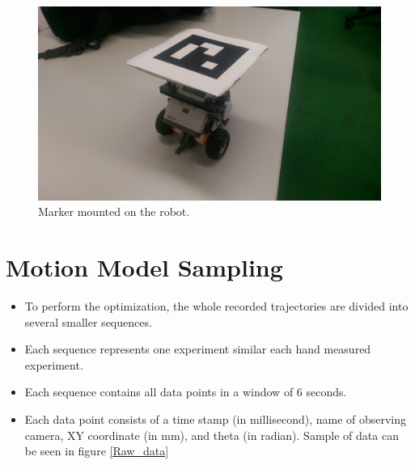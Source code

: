 \documentclass[paper=a4, fontsize=11pt]{scrartcl} %
\begin{document}
	\begin{figure}[h!]
        \begin{center}
            \setlength{\fboxsep}{0.5pt} %
            \setlength{\fboxrule}{0.5pt}
            \includegraphics[width=12cm,fbox]{images/marker_robot.jpg}
            \caption{Marker mounted on the robot.}
        \end{center}
    \end{figure}
    
    \newpage
    \section{Motion Model Sampling}
    \begin{itemize}
	    \item To perform the optimization, the whole recorded trajectories are divided into several smaller sequences.
	    \item Each sequence represents one experiment similar each hand measured experiment.
	    \item Each sequence contains all data points in a window of 6 seconds.
	    \item Each data point consists of a time stamp (in millisecond), name of observing camera, XY coordinate (in mm), and theta (in radian). Sample of data can be seen in figure \ref{Raw_data}
    \end{itemize}
    
\end{document}
